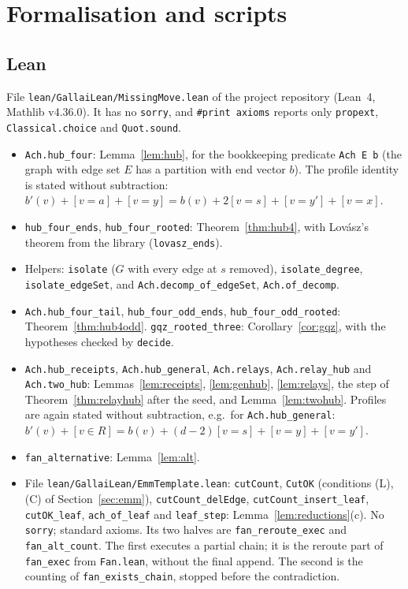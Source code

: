 \documentclass[11pt]{amsart}
\theoremstyle{definition}
\begin{document}
\section{Formalisation and scripts}\label{sec:scripts}
\sloppy

\subsection*{Lean} File \texttt{lean/GallaiLean/MissingMove.lean} of the project repository (Lean~4,
Mathlib v4.36.0). It has no \texttt{sorry}, and \texttt{\#print axioms} reports only
\texttt{propext}, \texttt{Classical.choice} and \texttt{Quot.sound}.
\begin{itemize}
\item \texttt{Ach.hub\_four}: Lemma~\ref{lem:hub}, for the bookkeeping predicate
\texttt{Ach E b} (the graph with edge set $E$ has a partition with end vector $b$). The profile
identity is stated without subtraction:
$b'(v)+[v=a]+[v=y]=b(v)+2[v=s]+[v=y']+[v=x]$.
\item \texttt{hub\_four\_ends}, \texttt{hub\_four\_rooted}: Theorem~\ref{thm:hub4}, with
Lov\'asz's theorem from the library (\texttt{lovasz\_ends}).
\item Helpers: \texttt{isolate} ($G$ with every edge at $s$ removed), \texttt{isolate\_degree},
\texttt{isolate\_edgeSet}, and \texttt{Ach.decomp\_of\_edgeSet}, \texttt{Ach.of\_decomp}.
\item \texttt{Ach.hub\_four\_tail}, \texttt{hub\_four\_odd\_ends}, \texttt{hub\_four\_odd\_rooted}:
Theorem~\ref{thm:hub4odd}. \texttt{gqz\_rooted\_three}: Corollary~\ref{cor:gqz}, with the
hypotheses checked by \texttt{decide}.
\item \texttt{Ach.hub\_receipts}, \texttt{Ach.hub\_general}, \texttt{Ach.relays},
\texttt{Ach.relay\_hub} and \texttt{Ach.two\_hub}: Lemmas~\ref{lem:receipts}, \ref{lem:genhub},
\ref{lem:relays}, the step of Theorem~\ref{thm:relayhub} after the seed, and
Lemma~\ref{lem:twohub}. Profiles are again stated without subtraction, e.g.\ for
\texttt{Ach.hub\_general}:
$b'(v)+[v\in R]=b(v)+(d-2)[v=s]+[v=y]+[v=y']$.
\item \texttt{fan\_alternative}: Lemma~\ref{lem:alt}.
\item File \texttt{lean/GallaiLean/EmmTemplate.lean}: \texttt{cutCount}, \texttt{CutOK} (conditions
(L), (C) of Section~\ref{sec:emm}), \texttt{cutCount\_delEdge}, \texttt{cutCount\_insert\_leaf},
\texttt{cutOK\_leaf}, \texttt{ach\_of\_leaf} and \texttt{leaf\_step}: Lemma~\ref{lem:reductions}(c).
No \texttt{sorry}; standard axioms. Its two halves are
\texttt{fan\_reroute\_exec} and \texttt{fan\_alt\_count}. The first executes a partial chain; it is
the reroute part of \texttt{fan\_exec} from \texttt{Fan.lean}, without the final append. The second
is the counting of \texttt{fan\_exists\_chain}, stopped before the contradiction.
\end{itemize}
\end{document}
